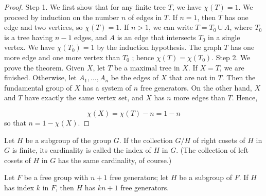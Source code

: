 \begin{proof}
	Step 1. We first show that for any finite tree \(T\), we have \(\chi ( T) = 1\). We proceed by induction on the number \(n\) of edges in \(T\). If \(n = 1\), then \(T\) has one edge and two vertices, so \(\chi ( T) = 1\). If \(n > 1\), we can write \(T = T_{0} \cup A\), where \(T_{0}\) is a tree having \(n - 1\) edges, and \(A\) is an edge that intersects \(T_{0}\) in a single vertex. We have \(\chi ( T_{0}) = 1\) by the induction hypothesis. The graph \(T\) has one more edge and one more vertex than \(T_{0}\) ; hence \(\chi ( T) = \chi ( T_{0})\).
Step 2. We prove the theorem. Given \(X\), let \(T\) be a maximal tree in \(X\). If \(X = T\), we are finished. Otherwise, let \(A_{1},\ldots ,A_{n}\) be the edges of \(X\) that are not in \(T\). Then the fundamental group of \(X\) has a system of \(n\) free generators. On the other hand, \(X\) and \(T\) have exactly the same vertex set, and \(X\) has \(n\) more edges than \(T\). Hence,

\[
\chi ( X) = \chi ( T) - n = 1 - n
\]
so that \(n = 1 - \chi ( X)\).
\end{proof}
\begin{definition}
	Let \(H\) be a subgroup of the group \(G\). If the collection \(G/H\) of right cosets of \(H\) in \(G\) is finite, its cardinality is called the index of \(H\) in \(G\). (The collection of left cosets of \(H\) in \(G\) has the same cardinality, of course.)
\end{definition}

\begin{theorem}
\label{thm:\thetheorem}
	Let \(F\) be a free group with \(n + 1\) free generators; let \(H\) be a subgroup of \(F\). If \(H\) has index \(k\) in \(F\), then \(H\) has \({kn} + 1\) free generators.
\end{theorem}

